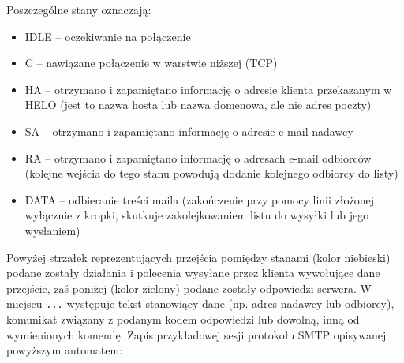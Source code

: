 \documentclass{pdfBooklets}
\begin{document}
\noindent
Poszczególne stany oznaczają:
\begin{itemize}
\item IDLE -- oczekiwanie na połączenie
\item C -- nawiązane połączenie w warstwie niższej (TCP)
\item HA -- otrzymano i zapamiętano informację o adresie klienta przekazanym w HELO (jest to nazwa hosta lub nazwa domenowa, ale nie adres poczty)
\item SA -- otrzymano i zapamiętano informację o adresie e-mail nadawcy
\item RA -- otrzymano i zapamiętano informację o adresach e-mail odbiorców (kolejne wejścia do tego stanu powodują dodanie kolejnego odbiorcy do listy)
\item DATA -- odbieranie treści maila (zakończenie przy pomocy linii złożonej wyłącznie z kropki, skutkuje zakolejkowaniem listu do wysyłki lub jego wysłaniem)
\end{itemize}

\noindent
Powyżej strzałek reprezentujących przejścia pomiędzy stanami (kolor niebieski) podane zostały działania i polecenia wysyłane przez klienta wywołujące dane przejście, zaś poniżej (kolor zielony) podane zostały odpowiedzi serwera.
W miejscu {\tt ...} występuje tekst stanowiący dane (np. adres nadawcy lub odbiorcy), komunikat związany z podanym kodem odpowiedzi lub dowolną, inną od wymienionych komendę.
Zapis przykładowej sesji protokołu SMTP opisywanej powyższym automatem:
\end{document}
